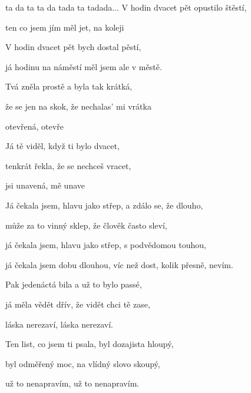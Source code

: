 

\zr
{} ta da ta ta da tada ta tadada...       
\kr
\zs
V  hodin dvacet pět  opustilo štěstí,

ten  co jsem jím měl jet, na koleji  

V  hodin dvacet pět  bych dostal pěstí,

já  hodinu na náměstí měl jsem 
ale v  městě.


Tvá  zněla prostě a byla tak krátká,

že  se jen na skok, že nechalas' mi vrátka

 otevřená,  otevře



Já  tě viděl, když ti bylo dvacet,

 tenkrát řekla, že se nechceš vracet,

 jsi unavená,  mě unave
\ks

\zr \kr

\zs
Já čekala jsem, hlavu jako střep, a zdálo se, že dlouho,

může za to vinný sklep, že člověk často sleví,

já čekala jsem, hlavu jako střep, s podvědomou touhou,

já čekala jsem dobu dlouhou, víc než dost, kolik přesně, nevím.



Pak jedenáctá bila a už to bylo passé,

já měla vědět dřív, že vidět chci tě zase,

láska nerezaví, láska nerezaví.



Ten list, co jsem ti psala, byl dozajista hloupý,

byl odměřený moc, na vlídný slovo skoupý,

už to nenapravím, už to nenapravím.
\ks
\zr \kr
\kp
